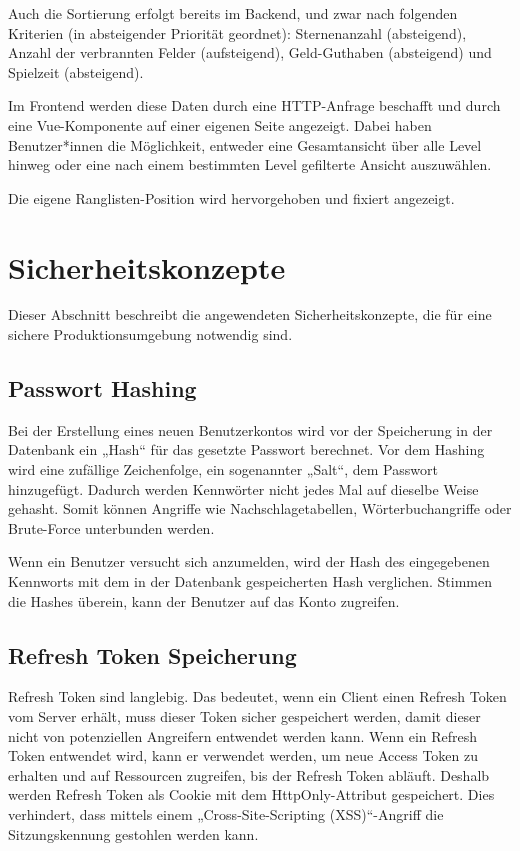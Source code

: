 \documentclass[letterpaper, 10 pt, conference]{ieeeconf}
\begin{document}
Auch die Sortierung erfolgt bereits im Backend, und zwar nach folgenden Kriterien (in absteigender Priorität geordnet):
Sternenanzahl (absteigend), Anzahl der verbrannten Felder (aufsteigend), Geld-Guthaben (absteigend) und Spielzeit (absteigend).

Im Frontend werden diese Daten durch eine HTTP-Anfrage beschafft und durch eine Vue-Komponente auf einer eigenen Seite angezeigt.
Dabei haben Benutzer*innen die Möglichkeit, entweder eine Gesamtansicht über alle Level hinweg oder eine nach einem bestimmten Level gefilterte Ansicht auszuwählen.

Die eigene Ranglisten-Position wird hervorgehoben und fixiert angezeigt.

\section{Sicherheitskonzepte}

Dieser Abschnitt beschreibt die angewendeten Sicherheitskonzepte, die für eine sichere Produktionsumgebung notwendig sind.

\subsection{Passwort Hashing}
Bei der Erstellung eines neuen Benutzerkontos wird vor der Speicherung in der Datenbank ein „Hash“ für das gesetzte Passwort berechnet. Vor dem Hashing wird eine zufällige Zeichenfolge, ein sogenannter „Salt“, dem Passwort hinzugefügt. Dadurch werden Kennwörter nicht jedes Mal auf dieselbe Weise gehasht. Somit können Angriffe wie Nachschlagetabellen, Wörterbuchangriffe oder Brute-Force unterbunden werden. 

Wenn ein Benutzer versucht sich anzumelden, wird der Hash des eingegebenen Kennworts mit dem in der Datenbank gespeicherten Hash verglichen.  Stimmen die Hashes überein, kann der Benutzer auf das Konto zugreifen.

\subsection{Refresh Token Speicherung} \label{refreshToken}
Refresh Token sind langlebig. Das bedeutet, wenn ein Client einen Refresh Token vom Server erhält, muss dieser Token sicher gespeichert werden, damit dieser nicht von potenziellen Angreifern entwendet werden kann. Wenn ein Refresh Token entwendet wird, kann er verwendet werden, um neue Access Token zu erhalten und auf Ressourcen zugreifen, bis der Refresh Token abläuft.  Deshalb werden Refresh Token als Cookie mit dem HttpOnly-Attribut gespeichert. Dies verhindert, dass mittels einem „Cross-Site-Scripting (XSS)“-Angriff die Sitzungskennung gestohlen werden kann. 
\end{document}
